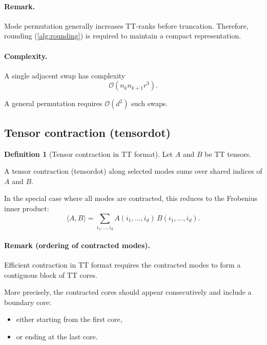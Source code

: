 \documentclass[11pt,a4paper,parskip=half-]{scrartcl}
\theoremstyle{definition}
\newtheorem{definition}{Definition}[section]
\theoremstyle{plain}
\theoremstyle{remark}
\begin{document}
\paragraph{Remark.}

Mode permutation generally increases TT-ranks before truncation.
Therefore, rounding (\cref{alg:rounding}) is required to maintain
a compact representation.

\paragraph{Complexity.}

A single adjacent swap has complexity
\[
\mathcal{O}(n_k n_{k+1} r^3).
\]

A general permutation requires $\mathcal{O}(d^2)$ such swaps.

\subsection{Tensor contraction (tensordot)}

\begin{definition}[Tensor contraction in TT format]

Let $A$ and $B$ be TT tensors.

A tensor contraction (tensordot) along selected modes sums over
shared indices of $A$ and $B$.

In the special case where all modes are contracted, this reduces to
the Frobenius inner product:
\[
\langle A,B\rangle =
\sum_{i_1,\dots,i_d}
A(i_1,\dots,i_d)\,B(i_1,\dots,i_d).
\]

\end{definition}

\paragraph{Remark (ordering of contracted modes).}

Efficient contraction in TT format requires the contracted modes
to form a contiguous block of TT cores.

More precisely, the contracted cores should appear consecutively
and include a boundary core:
\begin{itemize}
  \item either starting from the first core,
  \item or ending at the last core.
\end{itemize}
\end{document}
